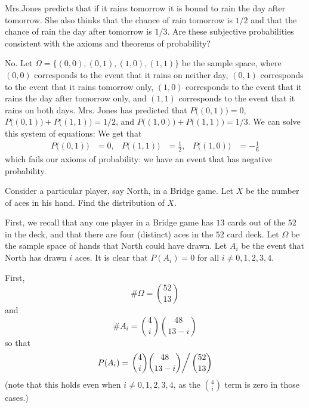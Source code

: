 \begin{problem}
  Mrs.\@ Jones predicts that if it rains tomorrow it is bound to rain the
  day after tomorrow. She also thinks that the chance of rain tomorrow is
  \(1/2\) and that the chance of rain the day after tomorrow is
  \(1/3\). Are these subjective probabilities consistent with the axioms
  and theorems of probability?
\end{problem}
\begin{solution}
  No. Let \(\Omega=\{(0,0),(0,1),(1,0),(1,1)\}\) be the sample space, where
  \((0,0)\) corresponds to the event that it rains on neither day,
  \((0,1)\) corresponds to the event that it rains tomorrow only, \((1,0)\)
  corresponds to the event that it rains the day after tomorrow only, and
  \((1,1)\) corresponds to the event that it rains on both days. Mrs.\@
  Jones has predicted that \(P\bigl((0,1)\bigr)=0 \),
  \(P\bigl((0,1)\bigr)+P\bigl((1,1)\bigr)=1/2\), and
  \(P\bigl((1,0)\bigr)+P\bigl((1,1)\bigr)=1/3\). We can solve this system
  of equations: We get that
  \begin{align*}
    P\bigl((0,1)\bigr)&=0,
    &P\bigl((1,1)\bigr)&=\frac{1}{2},
    &P\bigl((1,0)\bigr)&=-\frac{1}{6}
  \end{align*}
  which fails our axioms of probability: we have an event that has negative
  probability.
\end{solution}
\newpage

\begin{problem}[Handout 1, \# 16]
  Consider a particular player, say North, in a Bridge game. Let \(X\) be
  the number of aces in his hand. Find the distribution of \(X\).
\end{problem}
\begin{solution}
  First, we recall that any one player in a Bridge game has \(13\) cards
  out of the \(52\) in the deck, and that there are four (distinct) aces in
  the \(52\) card deck. Let \(\Omega\) be the sample space of hands that
  North could have drawn. Let \(A_i\) be the event that North has drawn
  \(i\) aces. It is clear that \(P(A_i) = 0\) for all \(i \neq 0,1,2,3,4\).

  First,
  \[
    \# \Omega= \binom{52}{13}
  \]
  and
  \[
    \# A_i= \binom{4}{i} \binom{48}{13-i}
  \]
  so that
  \[
    P(A_i)=\left.\binom{4}{i}\binom{48}{13-i}\right/\binom{52}{13}
  \]
  (note that this holds even when \(i \neq 0,1,2,3,4\), as the
  \(\displaystyle\binom{4}{i}\) term is zero in those cases.)
\end{solution}
\newpage

